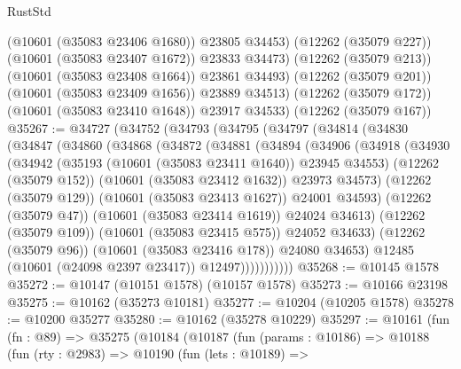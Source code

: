 \begin{lexlean}{RustStd}
\begin{coremodule}
              (@10601 (@35083 @23406 @1680))
              @23805
              @34453)
            (@12262 (@35079 @227))
            (@10601 (@35083 @23407 @1672))
            @23833
            @34473)
          (@12262 (@35079 @213))
          (@10601 (@35083 @23408 @1664))
          @23861
          @34493)
        (@12262 (@35079 @201))
        (@10601 (@35083 @23409 @1656))
        @23889
        @34513)
      (@12262 (@35079 @172))
      (@10601 (@35083 @23410 @1648))
      @23917
      @34533)
    (@12262 (@35079 @167))
@35267 := @34727
    (@34752
      (@34793
        (@34795
          (@34797
            (@34814
              (@34830
                (@34847
                  (@34860
                    (@34868
                      (@34872
                        (@34881
                          (@34894
                            (@34906
                              (@34918
                                (@34930
                                  (@34942
                                    (@35193 (@10601 (@35083 @23411 @1640)) @23945 @34553)
                                    (@12262 (@35079 @152))
                                    (@10601 (@35083 @23412 @1632))
                                    @23973
                                    @34573)
                                  (@12262 (@35079 @129))
                                  (@10601 (@35083 @23413 @1627))
                                  @24001
                                  @34593)
                                (@12262 (@35079 @47))
                                (@10601 (@35083 @23414 @1619))
                                @24024
                                @34613)
                              (@12262 (@35079 @109))
                              (@10601 (@35083 @23415 @575))
                              @24052
                              @34633)
                            (@12262 (@35079 @96))
                            (@10601 (@35083 @23416 @178))
                            @24080
                            @34653)
                          @12485
                          (@10601 (@24098 @2397 @23417))
                          @12497)))))))))))
@35268 := @10145 @1578
@35272 := @10147 (@10151 @1578) (@10157 @1578)
@35273 := @10166 @23198
@35275 := @10162 (@35273 @10181)
@35277 := @10204 (@10205 @1578)
@35278 := @10200 @35277
@35280 := @10162 (@35278 @10229)
@35297 := @10161
    (fun (fn : @89) =>
    @35275
      (@10184
        (@10187
          (fun (params : @10186) =>
          @10188
            (fun (rty : @2983) =>
            @10190
              (fun (lets : @10189) =>

\end{coremodule}
\end{lexlean}
